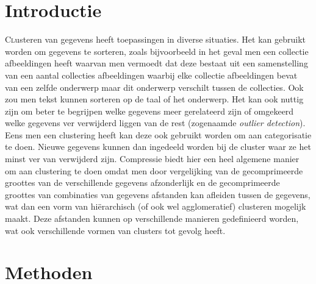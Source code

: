 \documentclass[twoside]{article}
\begin{document}
\begin{multicols}{2} %

\section{Introductie}

\lettrine[nindent=0em,lines=3]{C} lusteren van gegevens heeft toepassingen in diverse 
situaties. 
Het kan gebruikt worden om gegevens te sorteren, zoals bijvoorbeeld in het geval men
een collectie afbeeldingen heeft waarvan men vermoedt dat deze bestaat uit een 
samenstelling van een aantal collecties afbeeldingen waarbij elke collectie afbeeldingen
bevat van een zelfde onderwerp maar dit onderwerp verschilt tussen de collecties.
Ook zou men tekst kunnen sorteren op de taal of het onderwerp.
Het kan ook nuttig zijn om beter te begrijpen welke gegevens meer gerelateerd zijn of 
omgekeerd welke gegevens ver verwijderd liggen van de rest (zogenaamde \emph{outlier 
detection}).
Eens men een clustering heeft kan deze ook gebruikt worden om aan categorisatie te doen.
Nieuwe gegevens kunnen dan ingedeeld worden bij de cluster waar ze het minst ver van 
verwijderd zijn.
Compressie biedt hier een heel algemene manier om aan clustering te doen omdat men door
vergelijking van de gecomprimeerde groottes van de verschillende gegevens afzonderlijk 
en de gecomprimeerde groottes van combinaties van gegevens afstanden kan afleiden tussen
de gegevens, wat dan een vorm van hi\"erarchisch (of ook wel agglomeratief) clusteren
mogelijk maakt. Deze afstanden kunnen op verschillende manieren gedefinieerd worden,
wat ook verschillende vormen van clusters tot gevolg heeft.


\section{Methoden}


\end{multicols}
\end{document}
